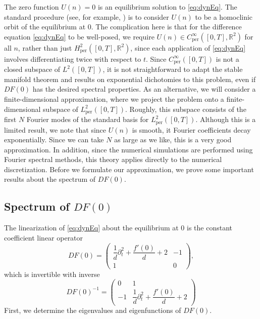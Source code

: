 \documentclass[12pt,reqno]{amsart}
\def\R{{\mathbb R}}
\def\per{\textrm{per}}
\begin{document}
The zero function $U(n) = 0$ is an equilibrium solution to \cref{eq:dynEq}. The standard procedure (see, for example, \cites{Parker2021,Parker2020,Sandstede1998}) is to consider $U(n)$ to be a homoclinic orbit of the equilibrium at 0. The complication here is that for the difference equation \cref{eq:dynEq} to be well-posed, we require $U(n) \in C_\per^\infty([0,T],\R^2)$ for all $n$, rather than just $H^2_\per([0,T], \R^2)$, since each application of \cref{eq:dynEq} involves differentiating twice with respect to $t$. Since $C_\per^\infty([0,T])$ is not a closed subspace of $L^2([0,T])$, it is not straightforward to adapt the stable manifold theorem and results on exponential dichotomies to this problem, even if $DF(0)$ has the desired spectral properties. As an alternative, we will consider a finite-dimensional approximation, where we project the problem onto a finite-dimensional subspace of $L_\per^2([0,T])$. Roughly, this subspace consists of the first $N$ Fourier modes of the standard basis for $L_\per^2([0,T])$. Although this is a limited result, we note that since $U(n)$ is smooth, it Fourier coefficients decay exponentially. Since we can take $N$ as large as we like, this is a very good approximation. In addition, since the numerical simulations are performed using Fourier spectral methods, this theory applies directly to the numerical discretization. Before we formulate our approximation, we prove some important results about the spectrum of $DF(0)$.

\subsection{Spectrum of \texorpdfstring{$DF(0)$}{DF(0)}}

The linearization of \cref{eq:dynEq} about the equilibrium at 0 is the constant coefficient linear operator 
\begin{equation}\label{eq:DF0}
DF(0) = \begin{pmatrix}
\dfrac{1}{d}\partial_t^2 + \dfrac{f'(0)}{d} + 2 & -1 \\ 1 & 0
\end{pmatrix},
\end{equation}
which is invertible with inverse
\begin{equation}\label{eq:DF0inv}
DF(0)^{-1} = \begin{pmatrix}
0 & 1 \\ -1 & \dfrac{1}{d}\partial_t^2 + \dfrac{f'(0)}{d} + 2
\end{pmatrix}
\end{equation}
First, we determine the eigenvalues and eigenfunctions of $DF(0)$.
\end{document}
